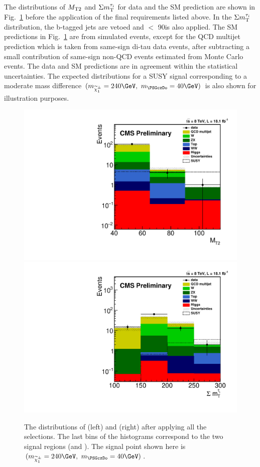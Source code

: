 The distributions of ${M_{\rm T2}}$ and $\Sigma m_{\rm T}^{\tau_i}$ for data and the SM prediction
are shown in Fig.~\ref{fig:comparison} before the application of the final
requirements listed above.
In the $\Sigma m_{\rm T}^{\tau_i}$ distribution, the b-tagged jets are vetoed and \mttwo $<$ 90\GeV is also applied.
The SM predictions in Fig.~\ref{fig:comparison} 
are from simulated events, except for the
QCD multijet prediction which is taken from same-sign di-tau data events,
after subtracting a small contribution of same-sign non-QCD events estimated from Monte Carlo events.
The data and SM predictions are in agreement within the statistical uncertainties.
The expected distributions for a SUSY signal 
corresponding to a moderate mass difference $(m_{\chione}=240\GeV,~m_{\PSGczDo}=40\GeV)$
is also shown for illustration purposes.
\begin{figure}[!htb]
\centering
\includegraphics[angle=0,scale=0.375]{TauTauFigs/MT2_SSQCD.pdf}
\includegraphics[angle=0,scale=0.375]{TauTauFigs/SumMT_SSQCD.pdf} \\ 
\caption{The distributions of \mttwo (left) and \SumMT (right) after applying all the selections. 
The last bins of the histograms correspond to the two signal regions (\binone and \bintwo). The signal point shown here is $(m_{\chione}=240\GeV,~m_{\PSGczDo}=40\GeV)$.}
\label{fig:comparison}
\end{figure}
